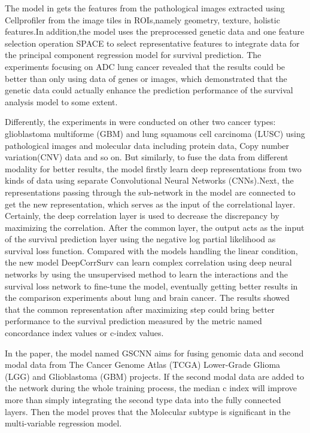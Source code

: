 \documentclass[journal,twoside,web]{ieeecolor}
\begin{document}
The model in \cite{zhu2016lung} gets the features from the pathological images extracted using Cellprofiler\cite{lamprecht2007cellprofiler} from the image tiles in ROIs,namely geometry, texture, holistic features.In addition,the model uses the preprocessed genetic data and one feature selection operation SPACE\cite{peng2009partial} to select representative features to integrate data for the principal component regression model for survival prediction.
The experiments focusing on ADC lung cancer revealed that the results could be better than only using data of genes or images, which demonstrated that the genetic data could actually enhance the prediction performance of the survival analysis model to some extent.

Differently, the experiments in \cite{yao2017deep} were conducted on other two cancer types: glioblastoma multiforme (GBM) and lung squamous cell carcinoma (LUSC) using pathological images and molecular data including protein data, Copy number variation(CNV) data and so on. 
But similarly, to fuse the data from different modality for better results, the model firstly learn deep representations from two kinds of data using separate Convolutional Neural Networks (CNNs).Next, the representations passing through the sub-network in the model are connected to get the new representation, which serves as the input of the correlational layer.
Certainly, the deep correlation layer is used to decrease the discrepancy by maximizing the correlation.
After the common layer, the output acts as the input of the survival prediction layer using the negative log partial likelihood as survival loss function.
Compared with the models handling the linear condition, the new model DeepCorrSurv can learn complex correlation using deep neural networks by using the unsupervised method to learn the interactions and the survival loss network to fine-tune the model, eventually getting better results in the comparison experiments about lung and brain cancer.
The results showed that the common representation after maximizing step could bring better performance to the survival prediction measured by the metric named concordance index values or c-index values.

In the paper\cite{mobadersany2018predicting}, the model named GSCNN aims for fusing genomic data and second modal data from The Cancer Genome Atlas (TCGA) Lower-Grade Glioma (LGG) and Glioblastoma (GBM) projects. 
If the second modal data are added to the network during the whole training process, the median c index will improve more than simply integrating the second type data into the fully connected layers. Then the model proves that the Molecular subtype is significant in the multi-variable regression model.
\end{document}
